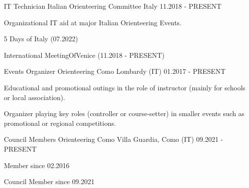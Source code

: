 
\begin{cventries}

  \cventry
  {IT Technician}
  {Italian Orienteering Committee}
  {Italy}
  {11.2018 - PRESENT}
  {
    \begin{cvitems}
      \item {Organizational IT aid at major Italian Orienteering Events.}
      \item {5 Days of Italy (07.2022)}
      \item {International MeetingOfVenice (11.2018 - PRESENT)}
    \end{cvitems}
  }

  \cventry
  {Events Organizer}
  {Orienteering Como}
  {Lombardy (IT)}
  {01.2017 - PRESENT}
  {
    \begin{cvitems}
      \item {Educational and promotional outings in the role of instructor (mainly for schools or local association).}
      \item {Organizer playing key roles (controller or course-setter) in smaller events such as promotional or regional competitions.}
    \end{cvitems}
  }

  \cventry
  {Council Members}
  {Orienteering Como}
  {Villa Guardia, Como (IT)}
  {09.2021 - PRESENT}
  {
    \begin{cvitems}
      \item {Member since 02.2016}
      \item {Council Member since 09.2021}
    \end{cvitems}
  }

\end{cventries}
